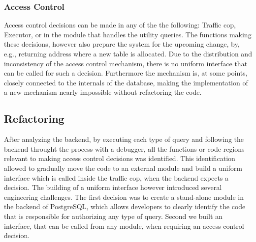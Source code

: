 \subsubsection{Access Control}
%
Access control decisions can be made in any of the the following: Traffic cop, Executor, or in the module that handles the utility queries.
%
The functions making these decisions, however also prepare the system for the upcoming change, by, e.g., returning address where a new table is allocated.
%
Due to the distribution and inconsistency of the access control mechanism, there is no uniform interface that can be called for such a decision.
%
Furthermore  the mechanism is, at some points, closely connected to the internals of the database, making the implementation of a new mechanism nearly impossible without refactoring the code.
%
\subsection{Refactoring}
%
After analyzing the backend, by executing each type of query and following the backend throught the process with a debugger, all the functions or code regions relevant to making access control decisions was identified.
%
This identification allowed to gradually move the code to an external module and build a uniform interface which is called inside the traffic cop, when the backend expects a decision. 
%
The building of a uniform interface however introduced several engineering challenges.
%
The first decision was to create a stand-alone module in the backend of PostgreSQL, which allows developers to clearly identify the code that is responsible for authorizing any type of query.
%
Second we built an interface, that can be called from any module, when requiring an access control decision.

